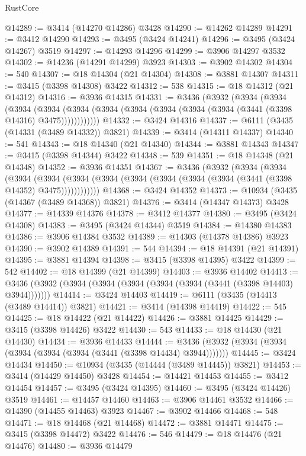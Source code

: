 \begin{lexlean}{RustCore}
\begin{coremodule}
@14289 := @3414 (@14270 @14286) @3428
@14290 := @14262 @14289
@14291 := @3412 @14290
@14293 := @3495 (@3424 @14241)
@14296 := @3495 (@3424 @14267) @3519
@14297 := @14293 @14296
@14299 := @3906 @14297 @3532
@14302 := @14236 (@14291 @14299) @3923
@14303 := @3902 @14302
@14304 := 540
@14307 := @18 @14304 (@21 @14304)
@14308 := @3881 @14307
@14311 := @3415 (@3398 @14308) @3422
@14312 := 538
@14315 := @18 @14312 (@21 @14312)
@14316 := @3936 @14315
@14331 := @3436
    (@3932
      (@3934
        (@3934
          (@3934
            (@3934 (@3934 (@3934 (@3934 (@3934 (@3934 (@3934 (@3441 (@3398 @14316) @3475))))))))))))
@14332 := @3424 @14316
@14337 := @6111 (@3435 (@14331 (@3489 @14332)) @3821)
@14339 := @3414 (@14311 @14337)
@14340 := 541
@14343 := @18 @14340 (@21 @14340)
@14344 := @3881 @14343
@14347 := @3415 (@3398 @14344) @3422
@14348 := 539
@14351 := @18 @14348 (@21 @14348)
@14352 := @3936 @14351
@14367 := @3436
    (@3932
      (@3934
        (@3934
          (@3934
            (@3934 (@3934 (@3934 (@3934 (@3934 (@3934 (@3934 (@3441 (@3398 @14352) @3475))))))))))))
@14368 := @3424 @14352
@14373 := @10934 (@3435 (@14367 (@3489 @14368)) @3821)
@14376 := @3414 (@14347 @14373) @3428
@14377 := @14339 @14376
@14378 := @3412 @14377
@14380 := @3495 (@3424 @14308)
@14383 := @3495 (@3424 @14344) @3519
@14384 := @14380 @14383
@14386 := @3906 @14384 @3532
@14389 := @14303 (@14378 @14386) @3923
@14390 := @3902 @14389
@14391 := 544
@14394 := @18 @14391 (@21 @14391)
@14395 := @3881 @14394
@14398 := @3415 (@3398 @14395) @3422
@14399 := 542
@14402 := @18 @14399 (@21 @14399)
@14403 := @3936 @14402
@14413 := @3436 (@3932 (@3934 (@3934 (@3934 (@3934 (@3934 (@3441 (@3398 @14403) @3944)))))))
@14414 := @3424 @14403
@14419 := @6111 (@3435 (@14413 (@3489 @14414)) @3821)
@14421 := @3414 (@14398 @14419)
@14422 := 545
@14425 := @18 @14422 (@21 @14422)
@14426 := @3881 @14425
@14429 := @3415 (@3398 @14426) @3422
@14430 := 543
@14433 := @18 @14430 (@21 @14430)
@14434 := @3936 @14433
@14444 := @3436 (@3932 (@3934 (@3934 (@3934 (@3934 (@3934 (@3441 (@3398 @14434) @3944)))))))
@14445 := @3424 @14434
@14450 := @10934 (@3435 (@14444 (@3489 @14445)) @3821)
@14453 := @3414 (@14429 @14450) @3428
@14454 := @14421 @14453
@14455 := @3412 @14454
@14457 := @3495 (@3424 @14395)
@14460 := @3495 (@3424 @14426) @3519
@14461 := @14457 @14460
@14463 := @3906 @14461 @3532
@14466 := @14390 (@14455 @14463) @3923
@14467 := @3902 @14466
@14468 := 548
@14471 := @18 @14468 (@21 @14468)
@14472 := @3881 @14471
@14475 := @3415 (@3398 @14472) @3422
@14476 := 546
@14479 := @18 @14476 (@21 @14476)
@14480 := @3936 @14479

\end{coremodule}
\end{lexlean}
